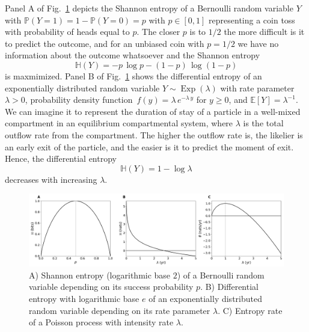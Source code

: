\documentclass[smallextended]{svjour3}
\renewcommand{\P}{\mathbb{P}}
\newcommand{\E}{\mathbb{E}}
\renewcommand{\H}{\mathbb{H}}
\newcommand{\Exp}{\operatorname{Exp}}
\newcommand{\pdf}{probability density function}
\begin{document}
Panel A of Fig.~\ref{fig:simple_entropy} depicts the Shannon entropy of a Bernoulli random variable $Y$ with $\P(Y=1)=1-\P(Y=0)=p$ with $p\in[0,1]$ representing a coin toss with probability of heads equal to $p$.
The closer $p$ is to $1/2$ the more difficult is it to predict the outcome, and for an unbiased coin with $p=1/2$ we have no information about the outcome whatsoever and the Shannon entropy
\begin{equation*}
	\H(Y) = -p\,\log p - (1-p)\,\log(1-p)
\end{equation*}
is maxmimized.
Panel B of Fig.~\ref{fig:simple_entropy} shows the differential entropy of an exponentially distributed random variable $Y\sim\Exp(\lambda)$ with rate parameter $\lambda>0$, \pdf\ $f(y) = \lambda\,e^{-\lambda\,y}$ for $y\geq0$, and $\E\left[Y\right]=\lambda^{-1}$.
We can imagine it to represent the duration of stay of a particle in a well-mixed compartment in an equilibrium compartmental system, where $\lambda$ is the total outflow rate from the compartment.
The higher the outflow rate is, the likelier is an early exit of the particle, and the easier is it to predict the moment of exit.
Hence, the differential entropy 
\begin{equation*}
	\H(Y) = 1-\log\lambda
\end{equation*}
decreases with increasing $\lambda$.

\begin{figure}[htbp]
  \vspace{-0.6cm}
  \centering
  \includegraphics[width=1.0\linewidth]{figs/simple_entropy_py.png}
  \caption{A) Shannon entropy (logarithmic base $2$) of a Bernoulli random variable depending on its success probability $p$.
  B) Differential entropy with logarithmic base $e$ of an exponentially distributed random variable depending on its rate parameter $\lambda$.
  C) Entropy rate of a Poisson process with intensity rate $\lambda$.}
  \label{fig:simple_entropy}
\end{figure}
\end{document}
